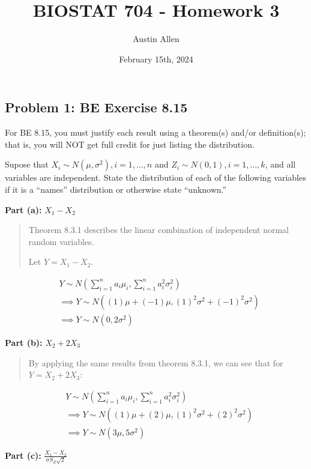 \documentclass[
]{article}
\title{BIOSTAT 704 - Homework 3}
\author{Austin Allen}
\date{February 15th, 2024}
\begin{document}
\maketitle

\hypertarget{problem-1-be-exercise-8.15}{%
\subsection{Problem 1: BE Exercise
8.15}\label{problem-1-be-exercise-8.15}}

For BE 8.15, you must justify each result using a theorem(s) and/or
definition(s); that is, you will NOT get full credit for just listing
the distribution.

Supose that \(X_i \sim N(\mu, \sigma^2), i = 1,...,n\) and
\(Z_i \sim N(0,1), i = 1,...,k\), and all variables are independent.
State the distribution of each of the following variables if it is a
``names'' distribution or otherwise state ``unknown.''

\textbf{Part (a):} \(X_1 - X_2\)

\begin{quote}
Theorem 8.3.1 describes the linear combination of independent normal
random variables.

Let \(Y = X_1 - X_2\).
\end{quote}

\begin{align*}
&Y \sim N\left(\sum_{i = 1}^{n} a_i \mu_i, \sum_{i = 1}^{n} a_i^2 \sigma_i^2\right)\\
&\implies Y \sim N\left((1) \mu + (-1)\mu, (1)^2\sigma^2 + (-1)^2 \sigma^2\right)\\
&\implies Y \sim N(0, 2\sigma^2)
\end{align*}

\textbf{Part (b):} \(X_2 + 2X_3\)

\begin{quote}
By applying the same results from theorem 8.3.1, we can see that for
\(Y = X_2 + 2X_3\):
\end{quote}

\begin{align*}
&Y \sim N\left(\sum_{i = 1}^{n} a_i \mu_i, \sum_{i = 1}^{n} a_i^2 \sigma_i^2\right)\\
&\implies Y \sim N\left((1) \mu + (2)\mu, (1)^2\sigma^2 + (2)^2 \sigma^2\right)\\
&\implies Y \sim N(3\mu, 5\sigma^2)
\end{align*}

\textbf{Part (c):} \(\frac{X_1 - X_2}{\sigma S_Z \sqrt{2}}\)
\end{document}
